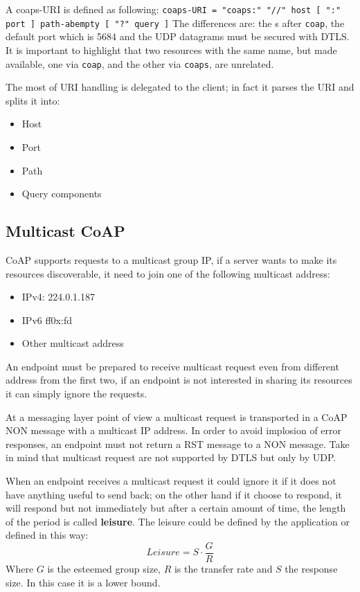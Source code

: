 	A coaps-URI is defined as following:
	\texttt{coaps-URI = "coaps:" "//" host [ ":" port ] path-abempty [ "?" query ]}
	The differences are: the s after \texttt{coap}, the default port which is 5684 and the UDP datagrams must be secured with DTLS.
	It is important to highlight that two resources with the same name, but made available, one via \texttt{coap}, and the other via \texttt{coaps}, are unrelated.
	
	The most of URI handling is delegated to the client; in fact it parses the URI and splits it into:\newline
	\begin{itemize}
		\item Host
		\item Port
		\item Path
		\item Query components
	\end{itemize}
	
	\subsection{Multicast CoAP}
	CoAP supports requests to a multicast group IP, if a server wants to make its resources discoverable, it need to join one of the following multicast address:
	\begin{itemize}
		\item IPv4: 224.0.1.187
		\item IPv6 ff0x:fd
		\item Other multicast address
	\end{itemize}

	An endpoint must be prepared to receive multicast request even from different address from the first two, if an endpoint is not interested in sharing its resources it can simply ignore the requests.\newline
	
	At a messaging layer point of view a multicast request is transported in a CoAP NON message with a multicast IP address.\newline
	In order to avoid implosion of error responses, an endpoint must not return a RST message to a NON message.\newline
	Take in mind that multicast request are not supported by DTLS but only by UDP.\newline
	
	When an endpoint receives a multicast request it could ignore it if it does not have anything useful to send back; on the other hand if it choose to respond, it will respond but not immediately but after a certain amount of time, the length of the period is called \textbf{leisure}.\newline
	The leisure could be defined by the application or defined in this way:
	\begin{equation}Leisure=S\cdot\frac{G}{R}\end{equation}
	Where $G$ is the esteemed group size, $R$ is the transfer rate and $S$ the response size.\newline
	In this case it is a lower bound.\newline
	
